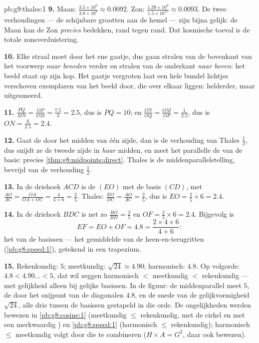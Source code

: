 \begin{solution}{pb:g9:thales:1}
\textbf{9.} Maan: $\frac{3.5 \times 10^6}{3.8 \times 10^8} \approx 0.0092$. Zon:
$\frac{1.39 \times 10^9}{1.5 \times 10^{11}} \approx 0.0093$. De twee verhoudingen
--- de schijnbare grootten aan de hemel --- zijn bijna gelijk: de Maan kan de Zon
\emph{precies} bedekken, rand tegen rand. Dat kosmische toeval is de totale
zonsverduistering.

\textbf{10.} Elke straal moet door het ene gaatje, dus gaan stralen van de
bovenkant van het voorwerp \emph{naar beneden} verder en stralen van de onderkant
\emph{naar boven}: het beeld staat op zijn kop. Het gaatje vergroten laat een hele
bundel lichtjes verschoven exemplaren van het beeld door, die over elkaar liggen:
helderder, maar uitgesmeerd.

\textbf{11.} $\frac{PQ}{MN} = \frac{OP}{OM} = \frac{7.5}{3} = 2.5$, dus is
$PQ = 10$; en $\frac{ON}{OQ} = \frac{OM}{OP} = \frac{1}{2.5}$, dus is
$ON = \frac{6}{2.5} = 2.4$.

\textbf{12.} Gaat de  door het midden van één zijde, dan is de verhouding
van Thales $\frac12$, dus snijdt ze de tweede zijde in \emph{haar} midden, en meet
het parallelle  de  van de basis: precies
\cref{thm:g8:midpoints:direct}. Thales is de middenparallelstelling, bevrijd van
de verhouding $\frac12$.

\textbf{13.} In de driehoek $ACD$ is de  $(EO)$  met de basis $(CD)$,
met $\frac{AO}{AC} = \frac{OA}{OA + OC} = \frac{4}{4 + 6} = \frac25$. Thales:
$\frac{EO}{DC} = \frac{AO}{AC} = \frac25$, dus is $EO = \frac25 \times 6 = 2.4$.

\textbf{14.} In de driehoek $BDC$ is net zo $\frac{BO}{BD} = \frac25$ en
$OF = \frac25 \times 6 = 2.4$. Bijgevolg is
\[
EF = EO + OF = 4.8
= \frac{2 \times 4 \times 6}{4 + 6} :
\]
het  van de basissen --- het gemiddelde van de
heen-en-terugritten (\cref{pb:g8:speed:1}), getekend in een trapezium.

\textbf{15.} Rekenkundig: $5$; meetkundig: $\sqrt{24} \approx 4.90$; harmonisch:
$4.8$. Op volgorde: $4.8 < 4.90\ldots < 5$, dat wil zeggen harmonisch $<$
meetkundig $<$ rekenkundig --- met gelijkheid alleen bij gelijke basissen. In de
figuur: de middenparallel meet $5$, de  door het snijpunt van de
diagonalen $4.8$, en de snede van de gelijkvormigheid $\sqrt{24}$, alle drie
tussen de basissen gestapeld in die orde. De ongelijkheden werden bewezen in
\cref{pb:g8:cosine:1} (meetkundig $\leq$ rekenkundig, met de cirkel en met een
merkwaardig ) en \cref{pb:g8:speed:1} (harmonisch $\leq$ rekenkundig);
harmonisch $\leq$ meetkundig volgt door die te combineren ($H \times A = G^2$,
daar ook bewezen).
\end{solution}
